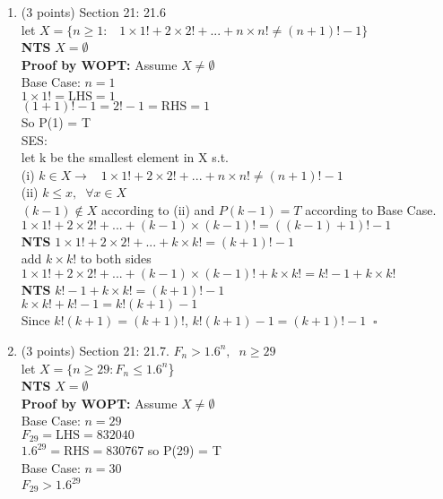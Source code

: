\documentclass[12pt]{article}
\begin{document}
\begin{enumerate}
    \item (3 points) Section 21: 21.6\\
    let $X = \{ n \geq 1 :\;\;\;1\times1! + 2\times2! + ... + n\times n! \neq (n+1)!-1\}$\\
    \textbf{NTS} $X=\emptyset$\\
    \textbf{Proof by WOPT: } Assume $X \neq \emptyset$\\
    Base Case: $n=1$\\
    $1\times 1! = \mbox{LHS} = 1$\\
    $(1+1)!-1 = 2! -1 = \mbox{RHS}=1$\\
    So P(1) = T \\
    SES:\\
    let k be the smallest element in X s.t.\\
    (i) $k \in X \rightarrow \;\;\; 1\times1! + 2\times2! + ... + n\times n! \neq (n+1)!-1$\\
    (ii) $k \leq x, \;\; \forall x \in X$\\
    $(k-1) \notin X$ according to (ii) and $P(k-1) = T$ according to Base Case.\\
    
    $1\times1! + 2\times2! + ... + (k-1)\times (k-1)! = ((k-1)+1)!-1$\\
    
    \textbf{NTS} $1\times1! + 2\times2! + ... + k\times k! = (k+1)!-1$\\
    
    add $k\times k!$ to both sides\\
    
    $1\times1! + 2\times2! + ... + (k-1)\times (k-1)! + k\times k! = k!-1 + k\times k!$\\
    
    \textbf{NTS} $k!-1 + k\times k! = (k+1)!-1$\\
    
    $ k\times k! + k! -1 = k!(k+1)-1  $\\
    
    Since $k!(k+1)=(k+1)!$, $k!(k+1)-1 = (k+1)!-1 \;\; \square$ 
    
    
    \item (3 points) Section 21:  21.7.  
    $F_n > 1.6^n , \;\; n\geq29$\\
    let $X = \{ n \geq 29 : F_n \leq 1.6^n$\}\\
    \textbf{NTS} $X=\emptyset$\\
    \textbf{Proof by WOPT: } Assume $X \neq \emptyset$\\
    Base Case: $n=29$\\
    $F_29 = \mbox{LHS}= 832040$\\
    $1.6^{29} = \mbox{RHS} = 830767 $
    so P(29) = T \\
    Base Case: $n=30$\\
    $F_29 > 1.6^{29}$ \\
     

\end{enumerate}
\end{document}
